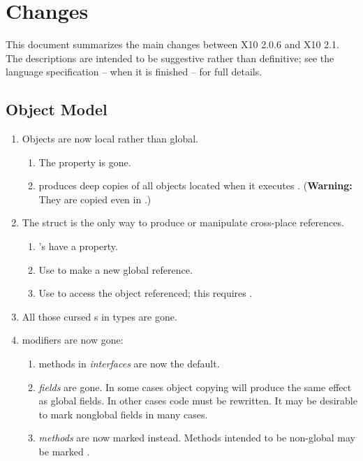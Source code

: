 \chapter{Changes}

This document summarizes the main changes between X10 2.0.6 and X10 2.1.  The
descriptions are intended to be suggestive rather than definitive; see the
language specification -- when it is finished -- for full details.

\section{Object Model}

\begin{enumerate}
\item Objects are now local rather than global.
   
    \begin{enumerate}
    \item The  property is gone.
    \item {} produces deep copies of all objects located 
          when it executes .  ({\bf Warning:} They are copied even in 
          .)
    \end{enumerate}

\item The  struct is the only way to produce or manipulate
      cross-place references.
    \begin{enumerate}
    \item {}'s have a  property.
    \item Use  to make a new global reference.
    \item Use  to access the object referenced; this
          requires . 
    \end{enumerate}


\item All those cursed \Xcd{!}s in types are gone.  

\item {} modifiers are now gone:
    
    \begin{enumerate}
    \item {} methods in {\em interfaces} are now the default. 
    \item {} {\em fields} are gone.  In some cases object copying
          will produce the same effect as global fields.  In other cases code
          must be rewritten.  It may be desirable to mark nonglobal fields
           in many cases.
    \item {} {\em methods} are now marked  instead.  
          Methods intended to be non-global may be marked .
    \end{enumerate}


\end{enumerate}


